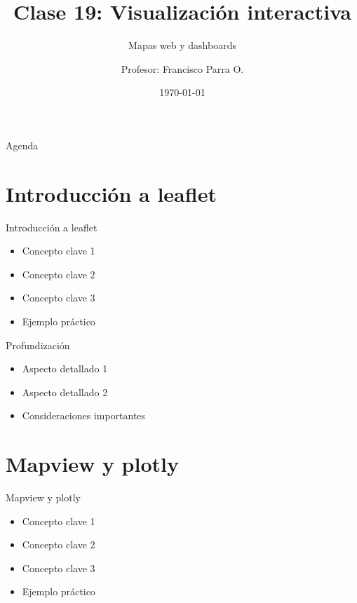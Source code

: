 \documentclass[10pt]{beamer}
\title{Clase 19: Visualización interactiva}
\subtitle{Mapas web y dashboards}
\author{Profesor: Francisco Parra O.}
\institute{USACH - Ingeniería Civil en Informática}
\date{\today}
\begin{document}
\maketitle

\begin{frame}{Agenda}
    \tableofcontents
\end{frame}


\section{Introducción a leaflet}

\begin{frame}{Introducción a leaflet}
    \begin{itemize}
        \item Concepto clave 1
        \item Concepto clave 2
        \item Concepto clave 3
        \item Ejemplo práctico
    \end{itemize}
\end{frame}

\begin{frame}{Profundización}
    \begin{itemize}
        \item Aspecto detallado 1
        \item Aspecto detallado 2
        \item Consideraciones importantes
    \end{itemize}
\end{frame}

\section{Mapview y plotly}

\begin{frame}{Mapview y plotly}
    \begin{itemize}
        \item Concepto clave 1
        \item Concepto clave 2
        \item Concepto clave 3
        \item Ejemplo práctico
    \end{itemize}
\end{frame}
\end{document}
